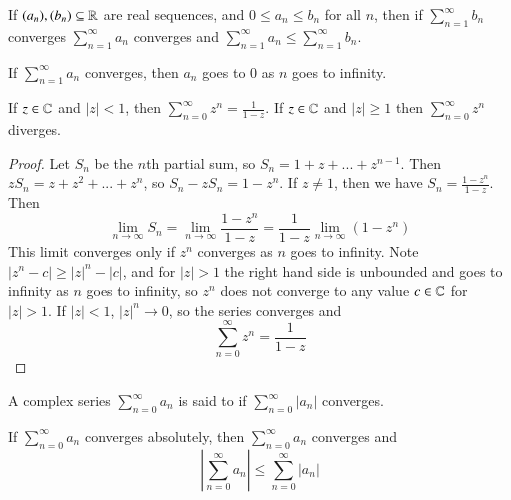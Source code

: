 \documentclass[12pt, a4paper, oneside, openright, titlepage]{book}
\begin{document}
\begin{thm}
    If $(a_n),(b_n) \subseteq \mathbb R$ are real sequences, and $0 \leq a_n \leq b_n$ for all $n$, then if $\sum_{n=1}^{\infty}b_n$ converges $\sum_{n=1}^{\infty}a_n$ converges and $\sum_{n=1}^{\infty}a_n \leq \sum_{n=1}^{\infty}b_n$.
\end{thm}


\begin{thm}
    If $\sum_{n=1}^{\infty}a_n$ converges, then $a_n$ goes to $0$ as $n$ goes to infinity.
\end{thm}


\begin{prop}
    If $z \in \mathbb C$ and $|z| < 1$, then $\sum_{n=0}^{\infty}z^n = \frac{1}{1-z}$. If $z \in \mathbb C$ and $|z| \geq 1$ then $\sum_{n=0}^{\infty}z^n$ diverges.
\end{prop}
\begin{proof}
    Let $S_n$ be the $n$th partial sum, so $S_n = 1+z+...+z^{n-1}$. Then $zS_n = z+z^2+...+z^n$, so $S_n-zS_n = 1-z^n$. If $z \neq 1$, then we have $S_n = \frac{1-z^n}{1-z}$. Then \begin{equation*}
        \lim\limits_{n\rightarrow \infty}S_n = \lim\limits_{n\rightarrow \infty}\frac{1-z^n}{1-z} = \frac{1}{1-z}\lim\limits_{n\rightarrow \infty}(1-z^n)
    \end{equation*}
    This limit converges only if $z^n$ converges as $n$ goes to infinity. Note $|z^n-c| \geq |z|^n-|c|$, and for $|z| > 1$ the right hand side is unbounded and goes to infinity as $n$ goes to infinity, so $z^n$ does not converge to any value $c \in \mathbb C$ for $|z| > 1$. If $|z| < 1$, $|z|^n\rightarrow 0$, so the series converges and \begin{equation*}
        \sum_{n=0}^{\infty}z^n = \frac{1}{1-z}
    \end{equation*}
\end{proof}

\begin{defn}
    A complex series $\sum_{n=0}^{\infty}a_n$ is said to  if $\sum_{n=0}^{\infty}|a_n|$ converges.
\end{defn}

\begin{thm}
    If $\sum_{n=0}^{\infty}a_n$ converges absolutely, then $\sum_{n=0}^{\infty}a_n$ converges and \begin{equation*}
        \left|\sum_{n=0}^{\infty}a_n\right| \leq \sum_{n=0}^{\infty}|a_n|
    \end{equation*}
\end{thm}
\end{document}
